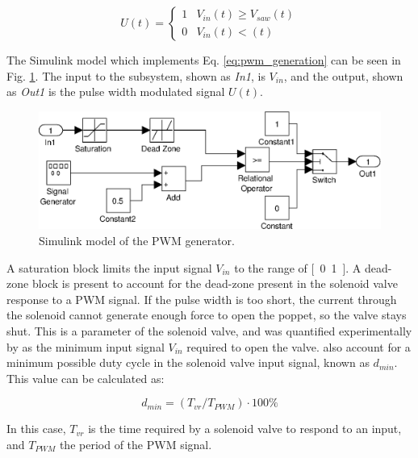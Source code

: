 \begin{equation}
\label{eq:pwm_generation}
U\left(t\right) = 
\begin{cases}
1 & V_{in}\left(t\right) \geq V_{saw}\left(t\right) \\
0 & V_{in}\left(t\right) < \left(t\right)
\end{cases}
\end{equation}

The Simulink model which implements Eq. \ref{eq:pwm_generation} can be seen in Fig. \ref{fig:pneumatics_pwm}. The input to the subsystem, shown as \emph{In1}, is $V_{in}$, and the output, shown as \emph{Out1} is the pulse width modulated signal $U(t)$. 

\begin{figure}[H]
\centering
\includegraphics[scale=0.65]{implementation/figures/pneumatic_modelling2.eps}
\caption{Simulink model of the PWM generator.}
\label{fig:pneumatics_pwm}
\end{figure}

A saturation block limits the input signal $V_{in}$ to the range of \unit{[0..1]}{\volt}. A dead-zone block is present to account for the dead-zone present in the solenoid valve response to a PWM signal. If the pulse width is too short, the current through the solenoid cannot generate enough force to open the poppet, so the valve stays shut. This is a parameter of the solenoid valve, and was quantified experimentally by \cite{valve_models} as the minimum input signal $V_{in}$ required to open the valve.  also account for a minimum possible duty cycle in the solenoid valve input signal, known as $d_{min}$. This value can be calculated as:

\begin{equation}
  \label{eq:pwm_duty_min}
  d_{min}=\left(T_{vr}/T_{PWM}\right)\cdot100\%
\end{equation}

In this case, $T_{vr}$ is the time required by a solenoid valve to respond to an input, and $T_{PWM}$ the period of the PWM signal.

